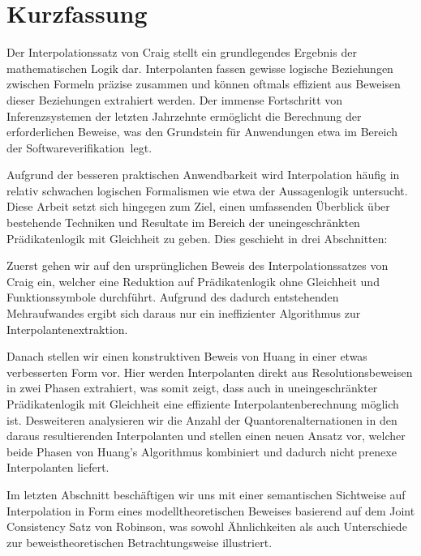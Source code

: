 \chapter*{Kurzfassung}

Der Interpolationssatz von Craig stellt ein grundlegendes Ergebnis der mathematischen Logik dar. Interpolanten fassen gewisse logische Beziehungen zwischen Formeln präzise zusammen und können oftmals effizient aus Beweisen dieser Beziehungen extrahiert werden. Der immense Fortschritt von Inferenzsystemen der letzten Jahrzehnte ermöglicht die Berechnung der erforderlichen Beweise, was den Grundstein für Anwendungen etwa im Bereich der Softwareverifikation~legt.

Aufgrund der besseren praktischen Anwendbarkeit wird Interpolation häufig in relativ schwachen logischen Formalismen wie etwa der Aussagenlogik untersucht. Diese Arbeit setzt sich hingegen zum Ziel, einen umfassenden Überblick über bestehende Techniken und Resultate im Bereich der uneingeschränkten Prädikatenlogik mit Gleichheit zu geben. Dies geschieht in drei Abschnitten:

Zuerst gehen wir auf den ursprünglichen Beweis des Interpolationssatzes von Craig ein, welcher eine Reduktion auf Prädikatenlogik ohne Gleichheit und Funktionssymbole durchführt.
Aufgrund des dadurch entstehenden Mehraufwandes ergibt sich daraus nur ein ineffizienter Algorithmus zur Interpolantenextraktion.

Danach stellen wir einen konstruktiven Beweis von Huang in einer etwas verbesserten Form vor. Hier werden Interpolanten direkt aus Resolutionsbeweisen in zwei Phasen extrahiert, was somit zeigt, dass auch in uneingeschränkter Prädikatenlogik mit Gleichheit eine effiziente Interpolantenberechnung möglich ist. Desweiteren analysieren wir die Anzahl der Quantorenalternationen in den daraus resultierenden Interpolanten und stellen einen neuen Ansatz vor, welcher beide Phasen von Huang's Algorithmus kombiniert und dadurch nicht prenexe Interpolanten liefert.

Im letzten Abschnitt beschäftigen wir uns mit einer semantischen Sichtweise auf Interpolation in Form eines modelltheoretischen Beweises basierend auf dem Joint Consistency Satz von Robinson, was sowohl Ähnlichkeiten als auch Unterschiede zur beweistheoretischen Betrachtungsweise illustriert.
